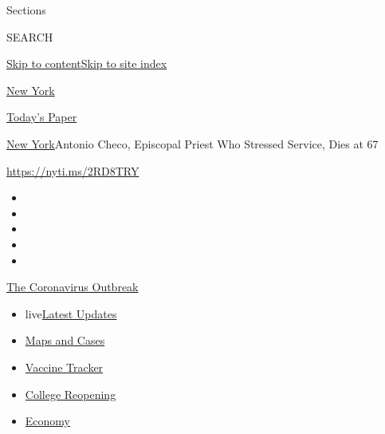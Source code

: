Sections

SEARCH

\protect\hyperlink{site-content}{Skip to
content}\protect\hyperlink{site-index}{Skip to site index}

\href{https://www.nytimes.com/section/nyregion}{New York}

\href{https://myaccount.nytimes.com/auth/login?response_type=cookie\&client_id=vi}{}

\href{https://www.nytimes.com/section/todayspaper}{Today's Paper}

\href{/section/nyregion}{New York}\textbar{}Antonio Checo, Episcopal
Priest Who Stressed Service, Dies at 67

\url{https://nyti.ms/2RD8TRY}

\begin{itemize}
\item
\item
\item
\item
\item
\end{itemize}

\href{https://www.nytimes.com/news-event/coronavirus?action=click\&pgtype=Article\&state=default\&region=TOP_BANNER\&context=storylines_menu}{The
Coronavirus Outbreak}

\begin{itemize}
\tightlist
\item
  live\href{https://www.nytimes.com/2020/08/03/world/coronavirus-covid-19.html?action=click\&pgtype=Article\&state=default\&region=TOP_BANNER\&context=storylines_menu}{Latest
  Updates}
\item
  \href{https://www.nytimes.com/interactive/2020/us/coronavirus-us-cases.html?action=click\&pgtype=Article\&state=default\&region=TOP_BANNER\&context=storylines_menu}{Maps
  and Cases}
\item
  \href{https://www.nytimes.com/interactive/2020/science/coronavirus-vaccine-tracker.html?action=click\&pgtype=Article\&state=default\&region=TOP_BANNER\&context=storylines_menu}{Vaccine
  Tracker}
\item
  \href{https://www.nytimes.com/2020/08/02/us/covid-college-reopening.html?action=click\&pgtype=Article\&state=default\&region=TOP_BANNER\&context=storylines_menu}{College
  Reopening}
\item
  \href{https://www.nytimes.com/live/2020/08/03/business/stock-market-today-coronavirus?action=click\&pgtype=Article\&state=default\&region=TOP_BANNER\&context=storylines_menu}{Economy}
\end{itemize}

